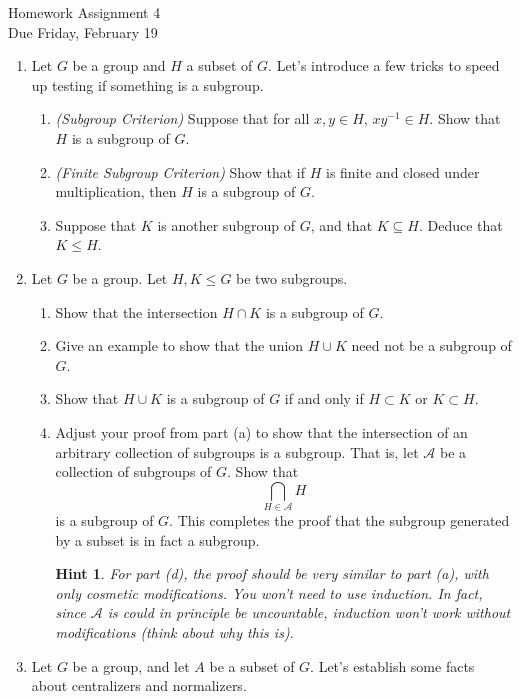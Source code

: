 \documentclass[11pt]{article}
\newtheorem*{hint}{Hint}
\newcommand{\cA}{\mathcal{A}}
\begin{document}
\begin{center}
\Large {Homework Assignment 4}\\
\small {Due Friday, February 19}
\end{center}
\begin{enumerate}
  \item Let $G$ be a group and $H$ a subset of $G$.  Let's introduce a few tricks to speed up testing if something is a subgroup.
  \begin{enumerate}
    \item \textit{(Subgroup Criterion)} Suppose that for all $x,y\in H$, $xy^{-1}\in H$.  Show that $H$ is a subgroup of $G$.
    \item \textit{(Finite Subgroup Criterion)} Show that if $H$ is finite and closed under multiplication, then $H$ is a subgroup of $G$.
    \item Suppose that $K$ is another subgroup of $G$, and that $K\subseteq H$.  Deduce that $K\le H$.
  \end{enumerate}
	\item Let $G$ be a group.  Let $H,K\le G$ be two subgroups.
  \begin{enumerate}
    \item Show that the intersection $H\cap K$ is a subgroup of $G$.
    \item Give an example to show that the union $H\cup K$ need not be a subgroup of $G$.
    \item Show that $H\cup K$ is a subgroup of $G$ if and only if $H\subset K$ or $K\subset H$.
    \item Adjust your proof from part (a) to show that the intersection of an arbitrary collection of subgroups is a subgroup.  That is, let $\cA$ be a collection of subgroups of $G$.  Show that
    \[\bigcap_{H\in\cA}H\]
    is a subgroup of $G$.  This completes the proof that the subgroup generated by a subset is in fact a subgroup.
    \begin{hint}
      For part (d), the proof should be very similar to part (a), with only cosmetic modifications.  You won't need to use induction.  In fact, since $\cA$ is could in principle be uncountable, induction won't work without modifications (think about why this is).
    \end{hint}
  \end{enumerate}
  \item Let $G$ be a group, and let $A$ be a subset of $G$.  Let's establish some facts about centralizers and normalizers.
  \begin{enumerate}

\end{enumerate}
\end{enumerate}
\end{document}
